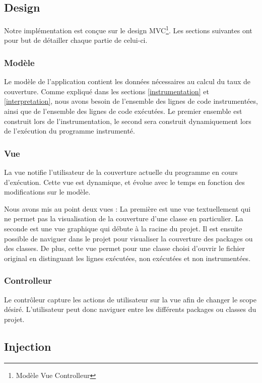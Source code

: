 \subsection{Design}

Notre implémentation est conçue sur le design MVC\footnote{Modèle Vue Controlleur}. Les sections suivantes ont pour but de détailler chaque partie de celui-ci.

\subsubsection{Modèle}

Le modèle de l'application contient les données nécessaires au calcul du taux de couverture. Comme expliqué dans les sections \ref{instrumentation} et \ref{interpretation}, nous avons besoin de l'ensemble des lignes de code instrumentées, ainsi que de l'ensemble des lignes de code exécutées. Le premier ensemble est construit lors de l'instrumentation, le second sera construit dynamiquement lors de l'exécution du programme instrumenté.
\newpage
\subsubsection{Vue}

La vue notifie l'utilisateur de la couverture actuelle du programme en cours d'exécution. Cette vue est dynamique, et évolue avec le temps en fonction des modifications sur le modèle.
\\
\par Nous avons mis au point deux vues :
La première est une vue textuellement qui ne permet pas la visualisation de la couverture d'une classe en particulier.
La seconde est une vue graphique qui débute à la racine du projet. Il est ensuite possible de naviguer dans le projet pour visualiser la couverture des packages ou des classes. De plus, cette vue permet pour une classe choisi d'ouvrir le fichier original en distinguant les lignes exécutées, non exécutées et non instrumentées. 

\subsubsection{Controlleur}

Le contrôleur capture les actions de utilisateur sur la vue afin de changer le scope désiré. L'utilisateur peut donc naviguer entre les différents packages ou classes du projet.

\subsection{Injection}

